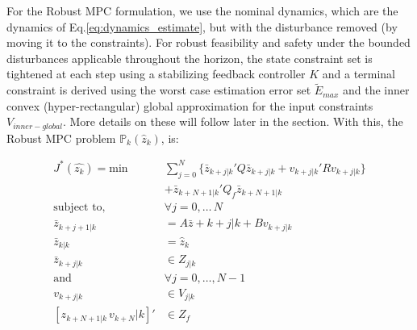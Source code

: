For the Robust MPC formulation, we use the nominal dynamics, which are the dynamics of Eq.\ref{eq:dynamics_estimate}, but with the disturbance removed (by moving it to the constraints). For robust feasibility and safety under the bounded disturbances applicable throughout the horizon, the state constraint set is tightened at each step using a stabilizing feedback controller $K$ and a terminal constraint is derived using the worst case estimation error set $\tilde{E}_{max}$ and the inner convex (hyper-rectangular) global approximation for the input constraints $V_{inner-global}$. More details on these will follow later in the section.
With this, the Robust MPC problem $\mathbb{P}_k(\hat{z}_k)$, is:

\begin{subequations} \label{eq:RMPC}
\begin{align}
J^{*}(\hat{z_k}) = \text{min} &\sum_{j=0}^{N}\lbrace\bar{z}_{k+j|k}'Q\bar{z}_{k+j|k} + {v}_{k+j|k}'R{v}_{k+j|k}\rbrace \nonumber \\ 
&+ \bar{z}_{k+N+1|k}'Q_f\bar{z}_{k+N+1|k} \label{eq:cost} \\
\text{subject to,} &\forall j=0,\dotsc\,N \nonumber \\
\bar{z}_{k+j+1|k}&=A\bar{z}+{k+j|k} + Bv_{k+j|k} \label{eq:nom_dyn} \\
\bar{z}_{k|k} &= \hat{z}_{k} \label{eq:init_cond}\\
\bar{z}_{k+j|k}& \in Z_{j|k} \label{eq:states_con}\\
\text{and } &\forall j=0,\dotsc,N-1 \nonumber \\
v_{k+j|k} & \in V_{j|k} \label{eq:input_con} \\
[z_{k+N+1|k} \, v_{k+N}|k]' & \in Z_f \label{eq:joint_term} 
\end{align}
\end{subequations}

